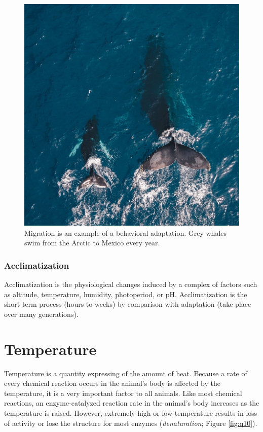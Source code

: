\documentclass[]{book}
\begin{document}
\begin{figure}

{\centering \includegraphics[width=1\linewidth]{figures/adaptation} 

}

\caption{Migration is an example of a behavioral adaptation. Grey whales swim from the Arctic to Mexico every year.}\label{fig:adaptation}
\end{figure}

\subsection{Acclimatization}\label{acclimatization}

Acclimatization is the physiological changes induced by a complex of
factors such as altitude, temperature, humidity, photoperiod, or pH.
Acclimatization is the short-term process (hours to weeks) by comparison
with adaptation (take place over many generations).

\chapter{Temperature}\label{temperature}

Temperature is a quantity expressing of the amount of heat. Because a
rate of every chemical reaction occurs in the animal's body is affected
by the temperature, it is a very important factor to all animals. Like
most chemical reactions, an enzyme-catalyzed reaction rate in the
animal's body increases as the temperature is raised. However, extremely
high or low temperature results in loss of activity or lose the
structure for most enzymes (\emph{denaturation}; Figure \ref{fig:q10}).
\end{document}
